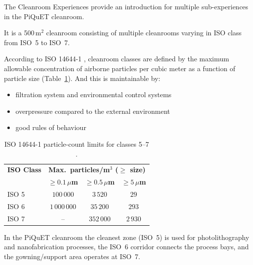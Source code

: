 
The Cleanroom Experiences provide an introduction for multiple
sub-experiences in the PiQuET cleanroom.

It is a 500\,m$^2$ cleanroom consisting of multiple cleanrooms
varying in ISO class from ISO~5 to ISO~7.

According to ISO 14644-1 \cite{ISO14644_1}, cleanroom classes are
defined by the maximum allowable concentration of airborne particles
per cubic meter as a function of particle size
(Table~\ref{tab:iso_classes}). And this is maintainable by:
\begin{itemize}
  \item filtration system and environmental control systems
  \item overpressure compared to the external environment
  \item good rules of behaviour
\end{itemize}
\begin{table}[H]
  \centering
  \begin{tabular}{lccc}
    \toprule
    \textbf{ISO Class} &
    \multicolumn{3}{c}{\textbf{\boldmath Max.\ particles/m$^3$
    ($\geq$ size)}} \\
    & \textbf{\boldmath$\geq 0.1\,\mu$m}
    & \textbf{\boldmath$\geq 0.5\,\mu$m}
    & \textbf{\boldmath$\geq 5\,\mu$m} \\
    \midrule
    ISO 5 & $100\,000$ & $3\,520$  & $29$   \\
    ISO 6 & $1\,000\,000$ & $35\,200$ & $293$  \\
    ISO 7 & --         & $352\,000$ & $2\,930$ \\
    \bottomrule
  \end{tabular}
  \caption{ISO 14644-1 particle-count limits for classes 5–7
  \cite{ISO14644_1}.}
  \label{tab:iso_classes}
\end{table}

In the PiQuET cleanroom the cleanest zone (ISO~5) is used for
photolithography and nanofabrication processes, the ISO~6 corridor
connects the process bays, and the gowning/support area operates at ISO~7.

